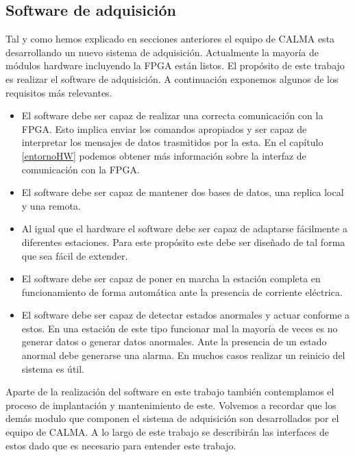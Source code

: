 	\subsection{Software de adquisición}
		Tal y como hemos explicado en secciones anteriores el equipo de CALMA esta desarrollando un nuevo sistema de adquisición. Actualmente
		la mayoría de módulos hardware incluyendo la FPGA están listos. El propósito de este trabajo es realizar el software de adquisición. A
		continuación exponemos algunos de los requisitos más relevantes.
		\begin{itemize}
			\item 	El software debe ser capaz de realizar una correcta comunicación con la FPGA. Esto implica enviar los comandos
				apropiados y ser capaz de interpretar los mensajes de datos trasmitidos por la esta. En el capítulo \ref{entornoHW}
				podemos obtener más información sobre la interfaz de comunicación con la FPGA.
			\item 	El software debe ser capaz de mantener dos bases de datos, una replica local y una remota.
			\item 	Al igual que el hardware el software debe ser capaz de adaptarse fácilmente a diferentes estaciones. Para este
				propósito este debe ser diseñado de tal forma que sea fácil de extender.
			\item 	El software debe ser capaz de poner en marcha la estación completa en funcionamiento de forma automática ante la
			  	presencia de corriente eléctrica. 
			\item 	El software debe ser capaz de detectar estados anormales y actuar conforme a estos. En una estación de este tipo
				funcionar mal la mayoría de veces es no generar datos o generar datos anormales. Ante la presencia de un estado
				anormal debe generarse una alarma. En muchos casos realizar un reinicio del sistema es útil. 
		\end{itemize}
		Aparte de la realización del software en este trabajo también contemplamos el proceso de implantación y mantenimiento de este.
		Volvemos a recordar que los demás modulo que componen el sistema de adquisición son desarrollados por el equipo de CALMA. A lo largo
		de este trabajo se describirán las interfaces de estos dado que es necesario para entender este trabajo. 
